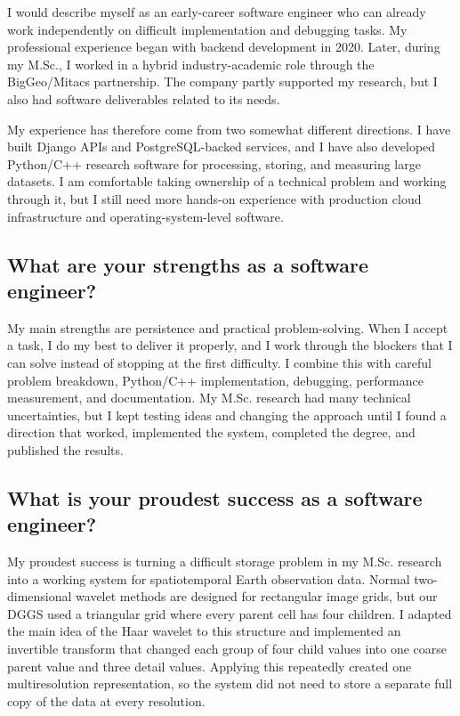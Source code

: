 \documentclass[11pt]{article}
\begin{document}
I would describe myself as an early-career software engineer who can already work independently on difficult implementation and debugging tasks. My professional experience began with backend development in 2020. Later, during my M.Sc., I worked in a hybrid industry-academic role through the BigGeo/Mitacs partnership. The company partly supported my research, but I also had software deliverables related to its needs.

My experience has therefore come from two somewhat different directions. I have built Django APIs and PostgreSQL-backed services, and I have also developed Python/C++ research software for processing, storing, and measuring large datasets. I am comfortable taking ownership of a technical problem and working through it, but I still need more hands-on experience with production cloud infrastructure and operating-system-level software.

\subsection*{What are your strengths as a software engineer?}

My main strengths are persistence and practical problem-solving. When I accept a task, I do my best to deliver it properly, and I work through the blockers that I can solve instead of stopping at the first difficulty. I combine this with careful problem breakdown, Python/C++ implementation, debugging, performance measurement, and documentation. My M.Sc. research had many technical uncertainties, but I kept testing ideas and changing the approach until I found a direction that worked, implemented the system, completed the degree, and published the results.

\subsection*{What is your proudest success as a software engineer?}

My proudest success is turning a difficult storage problem in my M.Sc. research into a working system for spatiotemporal Earth observation data. Normal two-dimensional wavelet methods are designed for rectangular image grids, but our DGGS used a triangular grid where every parent cell has four children. I adapted the main idea of the Haar wavelet to this structure and implemented an invertible transform that changed each group of four child values into one coarse parent value and three detail values. Applying this repeatedly created one multiresolution representation, so the system did not need to store a separate full copy of the data at every resolution.
\end{document}
